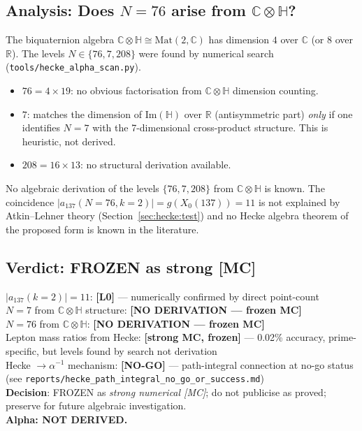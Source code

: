 \documentclass[12pt,a4paper]{article}
\theoremstyle{definition}
\theoremstyle{remark}
\begin{document}
\subsection{Analysis: Does $N=76$ arise from $\mathbb{C}\otimes\mathbb{H}$?}

The biquaternion algebra $\mathbb{C}\otimes\mathbb{H} \cong \mathrm{Mat}(2,\mathbb{C})$
has dimension $4$ over $\mathbb{C}$ (or $8$ over $\mathbb{R}$).
The levels $N \in \{76, 7, 208\}$ were found by numerical search
(\texttt{tools/hecke\_alpha\_scan.py}).

\begin{itemize}
  \item $76 = 4 \times 19$: no obvious factorisation from $\mathbb{C}\otimes\mathbb{H}$
    dimension counting.
  \item $7$: matches the dimension of $\mathrm{Im}(\mathbb{H})$ over $\mathbb{R}$
    (antisymmetric part) \emph{only} if one identifies $N=7$ with the
    7-dimensional cross-product structure.  This is heuristic, not derived.
  \item $208 = 16 \times 13$: no structural derivation available.
\end{itemize}

No algebraic derivation of the levels $\{76, 7, 208\}$ from
$\mathbb{C}\otimes\mathbb{H}$ is known.  The coincidence
$|a_{137}(N=76, k=2)| = g(X_0(137)) = 11$ is not explained by Atkin--Lehner
theory (Section~\ref{sec:hecke:test}) and no Hecke algebra theorem
of the proposed form is known in the literature.

\subsection{Verdict: FROZEN as strong [MC]}

\begin{statusbox}[title={T10 Verdict — 2026-05-17}]
$|a_{137}(k=2)| = 11$: \textbf{[L0]} — numerically confirmed by direct point-count\\
$N=7$ from $\mathbb{C}\otimes\mathbb{H}$ structure: \textbf{[NO DERIVATION — frozen MC]}\\
$N=76$ from $\mathbb{C}\otimes\mathbb{H}$: \textbf{[NO DERIVATION — frozen MC]}\\
Lepton mass ratios from Hecke: \textbf{[strong MC, frozen]} — 0.02\% accuracy,
prime-specific, but levels found by search not derivation\\
Hecke $\to \alpha^{-1}$ mechanism: \textbf{[NO-GO]} — path-integral connection
at no-go status (see \texttt{reports/hecke\_path\_integral\_no\_go\_or\_success.md})\\
\textbf{Decision}: FROZEN as \emph{strong numerical [MC]};
do not publicise as proved; preserve for future algebraic investigation.\\
\textbf{Alpha: NOT DERIVED.}
\end{statusbox}

\ifdefined\INCLUDEMODE
\else
  
\end{document}

